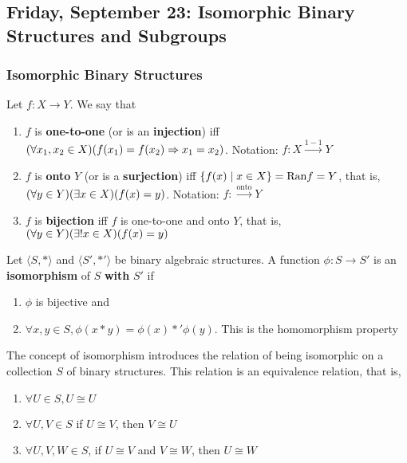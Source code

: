\subsection{Friday, September 23: Isomorphic Binary Structures and Subgroups}
\subsubsection{Isomorphic Binary Structures}

\begin{definition}
    Let $f: X \to Y$. We say that
    \begin{enumerate}
        \item $f$ is \textbf{one-to-one} (or is an \textbf{injection}) iff $\qty(\forall x_1, x_2 \in X)\qty(f(x_1) = f(x_2) \Rightarrow x_1 = x_2)$. Notation: $f: X \stackrel{1-1}{\to} Y$
        \item $f$ is \textbf{onto} $Y$ (or is a \textbf{surjection}) iff $\qty{f(x) \mid x \in X} = \text{Ran} f = Y$, that is, $\qty(\forall y \in Y) \qty(\exists x \in X) \qty(f(x) = y)$. Notation: $f : \stackrel{\text{onto}}{\to} Y$
        \item $f$ is \textbf{bijection} iff $f$ is one-to-one and onto $Y$, that is, $\qty(\forall y \in Y) \qty(\exists! x \in X) \qty(f(x) = y)$
    \end{enumerate}
\end{definition}

\begin{definition}[Isomorphism]
    Let $\langle S,  \ast \rangle$ and $\langle  S', \ast' \rangle$  be binary algebraic structures. A function $\phi : S \to S'$ is an \textbf{isomorphism} of $S$ \textbf{with} $S'$ if 
    \begin{enumerate}
        \item $\phi$ is bijective and 
        \item $\forall x, y \in S, \phi(x \ast y) = \phi (x) \ast' \phi (y)$. This is the homomorphism property
    \end{enumerate}
\end{definition}

\begin{remark}
    The concept of isomorphism introduces the relation of being isomorphic on a collection $S$ of binary structures. This relation is an equivalence relation, that is,
    \begin{enumerate}
        \item $\forall U \in S, U \cong U$
        \item $\forall U, V \in S$ if $U \cong V$, then $V \cong U$
        \item $\forall U, V, W \in S$, if $U \cong V$ and $V \cong W$, then $U \cong W$
    \end{enumerate}
\end{remark}

